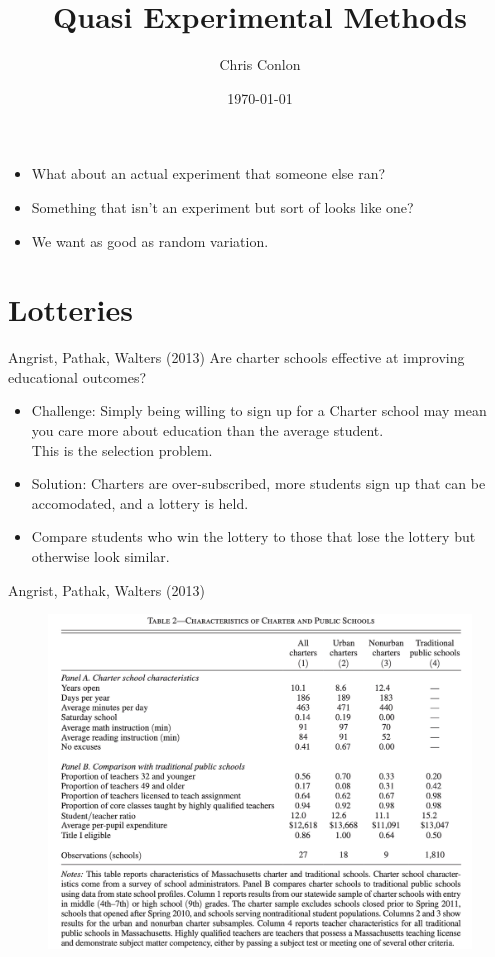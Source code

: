 


\title{Quasi Experimental Methods}
\author{Chris Conlon}
\date{\today}

\frame{\titlepage}


\begin{frame}{}
\begin{itemize}
\item What about an actual experiment that someone else ran?
\item Something that isn’t an experiment but sort of looks like one?
\item We want \alert{as good as random} variation.
\end{itemize}
\end{frame}
\section{Lotteries}

\begin{frame}{Angrist, Pathak, Walters (2013)}
Are charter schools effective at improving educational outcomes?
\begin{itemize}
    \item Challenge: Simply being willing to sign up for a Charter school may mean you care more about education than the average student.\\
    This is the \alert{selection problem}.
    \item Solution: Charters are over-subscribed, more students sign up that can be accomodated, and a lottery is held.
    \item Compare students who win the lottery to those that lose the lottery but otherwise look similar.
\end{itemize}
\end{frame}



\begin{frame}{Angrist, Pathak, Walters (2013)}
\begin{figure}
\centering
\includegraphics[width=4.5in]{./resources/apw_1.png}
\end{figure}
\end{frame}

